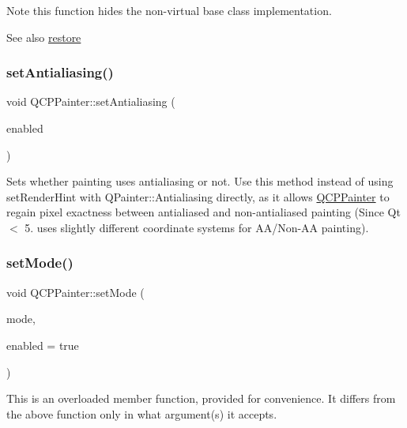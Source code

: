 \begin{DoxyNote}{Note}
this function hides the non-\/virtual base class implementation.
\end{DoxyNote}
\begin{DoxySeeAlso}{See also}
\hyperlink{class_q_c_p_painter_a64908e6298d5bbd83457dc987cc3a022}{restore} 
\end{DoxySeeAlso}
\mbox{\label{class_q_c_p_painter_aaba1deb9188244d9ea65b035112b4d05}} 
\subsubsection{\texorpdfstring{set\+Antialiasing()}{setAntialiasing()}}
{\footnotesize\ttfamily void Q\+C\+P\+Painter\+::set\+Antialiasing (\begin{DoxyParamCaption}\item[{bool}]{enabled }\end{DoxyParamCaption})}

Sets whether painting uses antialiasing or not. Use this method instead of using set\+Render\+Hint with Q\+Painter\+::\+Antialiasing directly, as it allows \hyperlink{class_q_c_p_painter}{Q\+C\+P\+Painter} to regain pixel exactness between antialiased and non-\/antialiased painting (Since Qt $<$ 5. uses slightly different coordinate systems for A\+A/\+Non-\/\+AA painting). \mbox{\label{class_q_c_p_painter_af6b1f7d2bbc548b10aa55d8b6ad49577}} 
\subsubsection{\texorpdfstring{set\+Mode()}{setMode()}}
{\footnotesize\ttfamily void Q\+C\+P\+Painter\+::set\+Mode (\begin{DoxyParamCaption}\item[{\hyperlink{class_q_c_p_painter_a156cf16444ff5e0d81a73c615fdb156d}{Q\+C\+P\+Painter\+::\+Painter\+Mode}}]{mode,  }\item[{bool}]{enabled = {\ttfamily true} }\end{DoxyParamCaption})}

This is an overloaded member function, provided for convenience. It differs from the above function only in what argument(s) it accepts.

